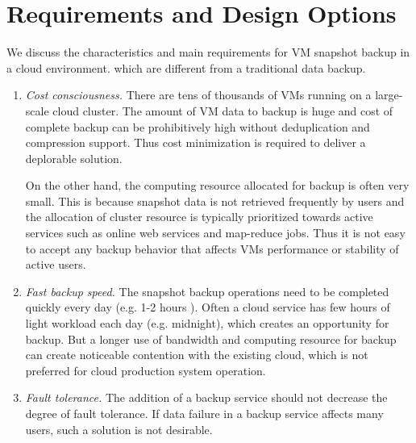 \section{Requirements and Design Options}
\label{sect:options}

We discuss the characteristics and 
main requirements for VM snapshot backup in a cloud environment.
which are different from a traditional data backup. 
\begin{enumerate}
\item {\em Cost consciousness.}
There are tens of thousands of VMs running on a large-scale cloud cluster. 
The amount of VM data to backup is huge and cost of complete backup can be prohibitively high without
deduplication and compression support.  Thus cost minimization is required to deliver a deplorable solution.

On the other hand, the computing resource allocated for backup is often very small.
This is because snapshot data is not retrieved frequently by users and the allocation of  cluster resource
is typically prioritized towards active services such as online web services and map-reduce jobs.
Thus  it is not easy to accept any backup behavior that affects VMs performance or stability of active users.  

\item {\em Fast backup speed.}
The snapshot  backup  operations need to be completed quickly  every day (e.g. 1-2 hours ). 
Often a cloud service has  few hours of light workload each day (e.g. midnight),  which creates an opportunity  for backup.
But a  longer use of bandwidth and computing resource  for backup can create  noticeable  contention with the existing cloud,
which is not preferred for cloud production system operation. 

\item {\em Fault tolerance.}
The addition of a backup service should not decrease the degree of
fault tolerance.  If data failure in  a backup service  affects many users,  such a solution is not desirable.
\end{enumerate}

